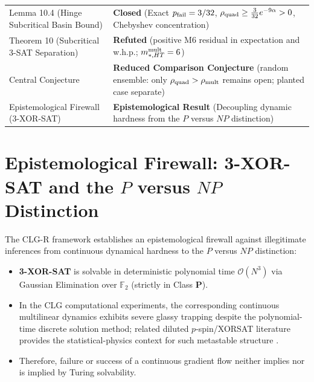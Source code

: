 \documentclass[11pt,a4paper]{article}
\begin{document}
\begin{table}[htbp]
\begin{tabularx}{\textwidth}{@{}lX@{}}
Lemma 10.4 (Hinge Subcritical Basin Bound) & \textbf{Closed} (Exact $p_{\rm fail} = 3/32$, $\rho_{\rm quad} \ge \frac{3}{32} e^{-9\alpha} > 0$, Chebyshev concentration) \\
Theorem 10 (Subcritical 3-SAT Separation) & \textbf{Refuted} (positive M6 residual in expectation and w.h.p.; $m_{*,HT}^{\rm mult}=6$) \\
Central Conjecture & \textbf{Reduced Comparison Conjecture} (random ensemble: only $\rho_{\rm quad}>\rho_{\rm mult}$ remains open; planted case separate) \\
Epistemological Firewall (3-XOR-SAT) & \textbf{Epistemological Result} (Decoupling dynamic hardness from the $P$ versus $NP$ distinction) \\
\bottomrule
\end{tabularx}
\label{tab:status_matrix}
\end{table}

\section{Epistemological Firewall: 3-XOR-SAT and the \texorpdfstring{$P$ versus $NP$}{P versus NP} Distinction}
The CLG-R framework establishes an epistemological firewall against illegitimate inferences from continuous dynamical hardness to the $P$ versus $NP$ distinction:
\begin{itemize}
    \item \textbf{3-XOR-SAT} is solvable in deterministic polynomial time $\mathcal{O}(N^3)$ via Gaussian Elimination over $\mathbb{F}_2$ (strictly in Class $\mathbf{P}$).
    \item In the CLG computational experiments, the corresponding continuous multilinear dynamics exhibits severe glassy trapping despite the polynomial-time discrete solution method; related diluted $p$-spin/XORSAT literature provides the statistical-physics context for such metastable structure \cite{ricci2010being, mezard2003two}.
    \item Therefore, failure or success of a continuous gradient flow neither implies nor is implied by Turing solvability.
\end{itemize}
\end{document}
